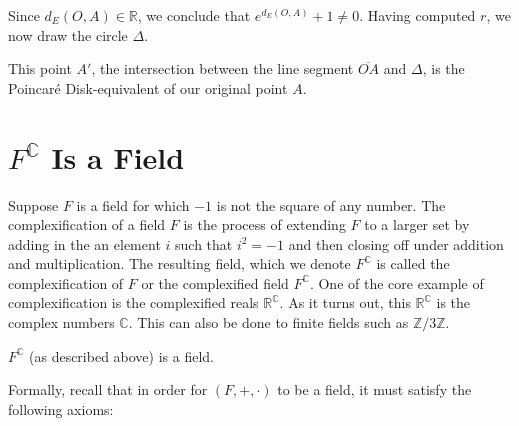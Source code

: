 \documentclass[12pt]{article}
\newcommand{\Z}{\mathbb{Z}}
\newcommand{\R}{\mathbb{R}}
\newcommand{\C}{\mathbb{C}}
\newcommand{\fc}{F^{\C}}
\newcommand{\poincare}{Poincar\'{e} }
\theoremstyle{plain}
\theoremstyle{definition}
\begin{document}
\begin{appendices}
Since $d_E(O,A)\in\R$, we conclude that $e^{d_E(O,A)} + 1 \neq 0$. Having computed $r$, we now draw the circle $\Delta$. 

\begin{center}
\end{center}

This point $A'$, the intersection between the line segment $\overline{OA}$ and $\Delta$, is the \poincare Disk-equivalent of our original point $A$.

\newpage 
\section{$\fc$ Is a Field} \label{appendixB}

	Suppose $F$ is a field for which $-1$ is not the square of any number. The complexification of a field $F$ is the process of extending $F$ to a larger set by adding in the an element $i$ such that $i^2 = -1$ and then closing off under addition and multiplication. The resulting field, which we denote $F^\C$ is called the complexification of $F$ or the complexified field $F^\C$. One of the core example of complexification is the complexified reals $\R^\C$. As it turns out, this $\R^\C$ is the complex numbers $\C$. This can also be done to finite fields such as $\Z/3\Z$.

 $\fc$ (as described above) is a field.

 Formally, recall that in order for $(F,+,\cdot)$ to be a field, it must satisfy the following axioms:


\end{appendices}
\end{document}
